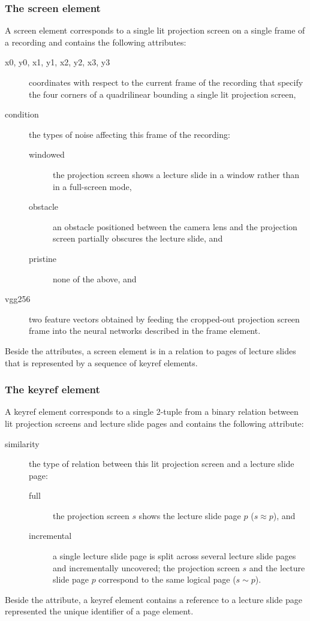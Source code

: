 \subsubsection*{The screen element}
A screen element corresponds to a single lit projection screen on a single
frame of a recording and contains the following attributes:
\begin{description}
  \item[x0\textmd, y0\textmd, x1\textmd, y1\textmd, x2\textmd, y2\textmd,
        x3\textmd, y3] coordinates with respect to the current frame
    of the recording that specify the four corners of a quadrilinear
    bounding a single lit projection screen,
  \item[condition] the types of noise affecting this frame of the recording:
    \begin{description}
      \item[windowed] the projection screen shows a lecture slide in a window
        rather than in a full-screen mode,
      \item[obstacle] an obstacle positioned between the camera lens and the
        projection screen partially obscures the lecture slide, and
      \item[pristine] none of the above, and
    \end{description}
  \item[vgg256] two  feature vectors obtained by feeding the
    cropped-out projection screen frame into the neural networks described in
    the frame element.
\end{description}
Beside the attributes, a screen element is in a relation to pages of lecture
slides that is represented by a sequence of keyref elements.

\subsubsection*{The keyref element}
A keyref element corresponds to a single 2-tuple from a binary relation between
lit projection screens and lecture slide pages and contains the following
attribute:
\begin{description}
  \item[similarity] the type of relation between this lit projection screen and
    a lecture slide page:
    \begin{description}
      \item[full] the projection screen $s$ shows the lecture slide page $p$
        ($s\approx p$), and
      \item[incremental] a single  lecture slide page is split
        across several lecture slide pages and incrementally uncovered; the
        projection screen $s$ and the lecture slide page $p$ correspond to the
        same logical page ($s\sim p$).
    \end{description}
\end{description}
Beside the attribute, a keyref element contains a reference to a lecture slide
page represented the unique identifier of a page element.

